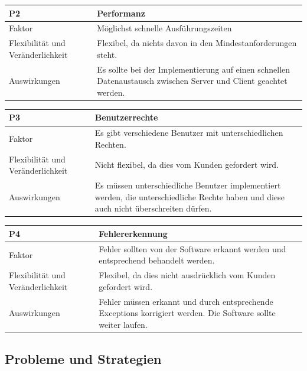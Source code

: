 \documentclass[fontsize=12pt,paper=a4,twoside]{scrartcl}
\begin{document}
\begin{table}[H]
\begin{tabular}{|p{3cm}|p{12cm}|}\hline
\textbf{P2} &  \textbf{Performanz}\\ \hline \hline
Faktor & Möglichst schnelle Ausführungszeiten\\ \hline
Flexibilität und Veränderlichkeit & Flexibel, da nichts davon in den Mindestanforderungen steht.\\ \hline
Auswirkungen & Es sollte bei der Implementierung auf einen schnellen Datenaustausch zwischen Server und Client geachtet werden. \\ \hline
\end{tabular}
\end{table}

\begin{table}[H]
\begin{tabular}{|p{3cm}|p{12cm}|}\hline
\textbf{P3} &  \textbf{Benutzerrechte} \\ \hline \hline
Faktor & Es gibt verschiedene Benutzer mit unterschiedlichen Rechten.\\ \hline
Flexibilität und Veränderlichkeit & Nicht flexibel, da dies vom Kunden gefordert wird.\\ \hline
Auswirkungen & Es müssen unterschiedliche Benutzer implementiert werden, die unterschiedliche Rechte haben und diese auch nicht überschreiten dürfen. \\ \hline
\end{tabular}
\end{table}

\begin{table}[H]
\begin{tabular}{|p{3cm}|p{12cm}|}\hline
\textbf{P4} &  \textbf{Fehlererkennung} \\ \hline \hline
Faktor & Fehler sollten von der Software erkannt werden und entsprechend behandelt werden.\\ \hline
Flexibilität und Veränderlichkeit & Flexibel, da dies nicht ausdrücklich vom Kunden gefordert wird.\\ \hline
Auswirkungen & Fehler müssen erkannt und durch entsprechende Exceptions korrigiert werden. Die Software sollte weiter laufen.  \\ \hline
\end{tabular}
\end{table}

\subsection{Probleme und Strategien}
\label{sec:strategien}
\end{document}
